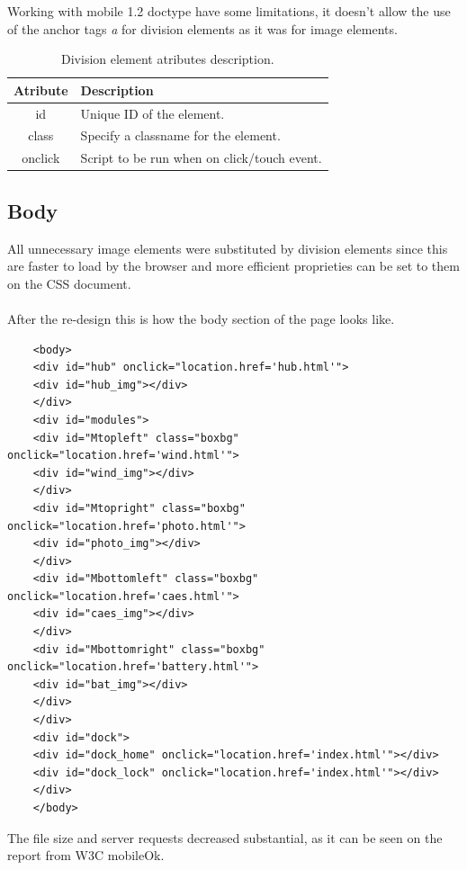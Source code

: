 Working with mobile 1.2 doctype have some limitations, it doesn't allow the use of the anchor tags \textit{a} for division elements as it was for image elements.

\begin{table}[h!]
\begin{tabular}{ | c | l | }
\hline
\textbf{Atribute} & \textbf{Description} \\ \hline
id & Unique ID of the element. \\ \hline
class &Specify a classname for the element. \\ \hline
onclick & Script to be run when on click/touch event. \\ \hline
\end{tabular}
\caption{Division element atributes description.}
\end{table}

\subsection{Body}

All unnecessary image elements were substituted by division elements since this are faster to load by the browser and more efficient proprieties can be set to them on the CSS document.\\
\\After the re-design this is how the body section of the page looks like.
\\
\begin{lstlisting}
	<body>
	<div id="hub" onclick="location.href='hub.html'">
	<div id="hub_img"></div>
	</div>
	<div id="modules">
	<div id="Mtopleft" class="boxbg" onclick="location.href='wind.html'">
	<div id="wind_img"></div>
	</div>
	<div id="Mtopright" class="boxbg" onclick="location.href='photo.html'">
	<div id="photo_img"></div>
	</div>
	<div id="Mbottomleft" class="boxbg" onclick="location.href='caes.html'">
	<div id="caes_img"></div>
	</div>
	<div id="Mbottomright" class="boxbg" onclick="location.href='battery.html'">
	<div id="bat_img"></div>
	</div>
	</div>
	<div id="dock">
	<div id="dock_home" onclick="location.href='index.html'"></div>
	<div id="dock_lock" onclick="location.href='index.html'"></div>
	</div>
	</body>
\end{lstlisting}

The file size and server requests decreased substantial, as it can be seen on the report from W3C mobileOk.

